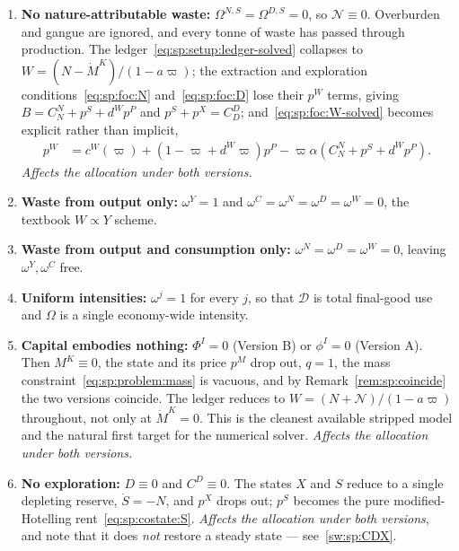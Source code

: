 \begin{enumerate}[label=\textbf{(W\arabic*)},ref=W\arabic*,leftmargin=3.2em,itemsep=0.35em]

\item\label{sw:sp:nature} \textbf{No nature-attributable waste:}
$\Omega^{N,S}=\Omega^{D,S}=0$, so $\mathcal N\equiv0$. Overburden and gangue are ignored, and every
tonne of waste has passed through production. The ledger~\eqref{eq:sp:setup:ledger-solved} collapses
to $W=\left(N-\dot M^K\right)/\left(1-a\varpi\right)$; the extraction and exploration
conditions~\eqref{eq:sp:foc:N} and~\eqref{eq:sp:foc:D} lose their $p^W$ terms, giving
$B=C^N_N+p^S+d^Wp^P$ and $p^S+p^X=C^D_D$; and~\eqref{eq:sp:foc:W-solved} becomes explicit rather
than implicit,
\begin{align}
p^W &= c^W\!\left(\varpi\right)+\left(1-\varpi+d^W\varpi\right)p^P
-\varpi\alpha\left(C^N_N+p^S+d^Wp^P\right).
\label{eq:sp:versions:pW-simple}
\end{align}
\emph{Affects the allocation under both versions.}

\item\label{sw:sp:omegaY} \textbf{Waste from output only:}
$\omega^Y=1$ and $\omega^C=\omega^{N}=\omega^{D}=\omega^W=0$, the textbook $W\propto Y$ scheme.

\item\label{sw:sp:omegaYC} \textbf{Waste from output and consumption only:}
$\omega^{N}=\omega^{D}=\omega^W=0$, leaving $\omega^Y,\omega^C$ free.

\item\label{sw:sp:uniform} \textbf{Uniform intensities:} $\omega^j=1$ for every $j$, so that
$\mathcal D$ is total final-good use and $\Omega$ is a single economy-wide intensity.

\item\label{sw:sp:phiI} \textbf{Capital embodies nothing:} $\Phi^I=0$ (Version B) or $\phi^I=0$
(Version A). Then $M^K\equiv0$, the state and its price $p^M$ drop out, $q=1$, the mass
constraint~\eqref{eq:sp:problem:mass} is vacuous, and by Remark~\ref{rem:sp:coincide} the two
versions coincide. The ledger reduces to $W=\left(N+\mathcal N\right)/\left(1-a\varpi\right)$
throughout, not only at $\dot M^K=0$. This is the cleanest available stripped model and the natural
first target for the numerical solver. \emph{Affects the allocation under both versions.}

\item\label{sw:sp:explore} \textbf{No exploration:} $D\equiv0$ and $C^D\equiv0$. The states $X$ and
$S$ reduce to a single depleting reserve, $\dot S=-N$, and $p^X$ drops out; $p^S$ becomes the pure
modified-Hotelling rent~\eqref{eq:sp:costate:S}. \emph{Affects the allocation under both versions},
and note that it does \emph{not} restore a steady state --- see~\ref{sw:sp:CDX}.


\end{enumerate}
